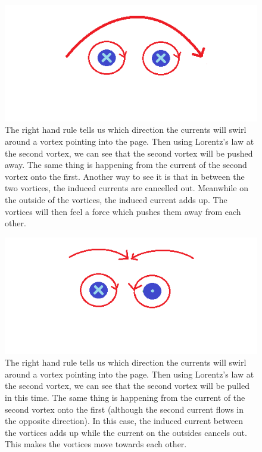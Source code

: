 \begin{figure}[htbp]
\begin{center}
\includegraphics[scale=.50]{sameDirection.png}
\caption{The right hand rule tells us which direction the currents will swirl around a vortex pointing into the page. Then using Lorentz's law  at the second vortex, we can see that the second vortex will be pushed away. The same thing is happening from the current of the second vortex onto the first. Another way to see it is that in between the two vortices, the induced currents are cancelled out. Meanwhile on the outside of the vortices, the induced current adds up. The vortices will then feel a force which pushes them away from each other.}
\label{sameV}
\end{center}
\end{figure}

\begin{figure}[htbp]
\begin{center}
\includegraphics[scale=.50]{oppositeDirection.png}
\caption{The right hand rule tells us which direction the currents will swirl around a vortex pointing into the page. Then using Lorentz's law  at the second vortex, we can see that the second vortex will be pulled in this time. The same thing is happening from the current of the second vortex onto the first (although the second current flows in the opposite direction). In this case, the induced current between the vortices adds up while the current on the outsides cancels out. This makes the vortices move towards each other.}
\label{diffV}
\end{center}
\end{figure}

